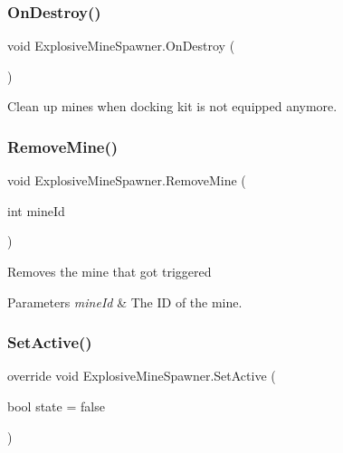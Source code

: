 \hypertarget{class_explosive_mine_spawner_a241dd83d808eea6450f490907d42bf51}{}\label{class_explosive_mine_spawner_a241dd83d808eea6450f490907d42bf51} 
\subsubsection{\texorpdfstring{On\+Destroy()}{OnDestroy()}}
{\footnotesize\ttfamily void Explosive\+Mine\+Spawner.\+On\+Destroy (\begin{DoxyParamCaption}{ }\end{DoxyParamCaption})}



Clean up mines when docking kit is not equipped anymore. 

\hypertarget{class_explosive_mine_spawner_a8c988e5aad957749f9d990cf9bb4f169}{}\label{class_explosive_mine_spawner_a8c988e5aad957749f9d990cf9bb4f169} 
\subsubsection{\texorpdfstring{Remove\+Mine()}{RemoveMine()}}
{\footnotesize\ttfamily void Explosive\+Mine\+Spawner.\+Remove\+Mine (\begin{DoxyParamCaption}\item[{int}]{mine\+Id }\end{DoxyParamCaption})}



Removes the mine that got triggered 


\begin{DoxyParams}{Parameters}
{\em mine\+Id} & The ID of the mine.\\
\hline
\end{DoxyParams}
\hypertarget{class_explosive_mine_spawner_acef27903b71a80e7dffb8262b92b0b69}{}\label{class_explosive_mine_spawner_acef27903b71a80e7dffb8262b92b0b69} 
\subsubsection{\texorpdfstring{Set\+Active()}{SetActive()}}
{\footnotesize\ttfamily override void Explosive\+Mine\+Spawner.\+Set\+Active (\begin{DoxyParamCaption}\item[{bool}]{state = {\ttfamily false} }\end{DoxyParamCaption})\hspace{0.3cm}{\ttfamily [virtual]}}



